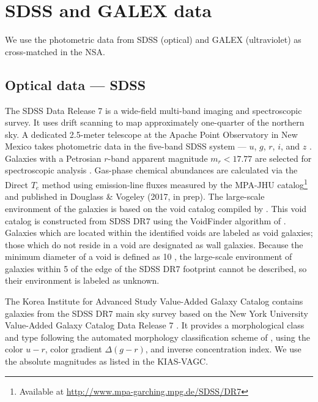 
\section[Data]{SDSS and GALEX data}

We use the photometric data from SDSS (optical) and GALEX (ultraviolet) as 
cross-matched in the NSA.

\subsection{Optical data --- SDSS}\label{sec:SDSS}

The SDSS Data Release 7 \citep[DR7]{Abazajian09} is a wide-field multi-band 
imaging and spectroscopic survey.  It uses drift scanning to map approximately 
one-quarter of the northern sky.  A dedicated 2.5-meter telescope at the Apache 
Point Observatory in New Mexico takes photometric data in the five-band SDSS 
system --- $u$, $g$, $r$, $i$, and $z$ \citep{Fukugita96,Gunn98}.  Galaxies with 
a Petrosian $r$-band apparent magnitude $m_r < 17.77$ are selected for 
spectroscopic analysis \citep{Lupton01,Strauss02}.  Gas-phase chemical 
abundances are calculated via the Direct $T_e$ method using emission-line fluxes 
measured by the MPA-JHU catalog\footnote{Available at 
\url{http://www.mpa-garching.mpg.de/SDSS/DR7}} and published in Douglass \& 
Vogeley (2017, in prep).  The large-scale environment of the galaxies is based 
on the void catalog compiled by \cite{Pan12}.  This void catalog is constructed 
from SDSS DR7 using the VoidFinder algorithm of \cite{Hoyle02}.  Galaxies which 
are located within the identified voids are labeled as void galaxies; those 
which do not reside in a void are designated as wall galaxies.  Because the 
minimum diameter of a void is defined as 10 \hMpc , the large-scale environment 
of galaxies within 5 \hMpc of the edge of the SDSS DR7 footprint cannot be 
described, so their environment is labeled as unknown.

The Korea Institute for Advanced Study Value-Added Galaxy Catalog 
\citep[KIAS-VAGC]{Choi10} contains galaxies from the SDSS DR7 main sky survey 
based on the New York University Value-Added Galaxy Catalog Data Release 7 
\citep[NYU-VAGC]{Blanton05}.  It provides a morphological class and type 
following the automated morphology classification scheme of \cite{Park05}, using 
the color $u-r$, color gradient $\Delta (g-r)$, and inverse concentration index.  
We use the absolute magnitudes as listed in the KIAS-VAGC.

